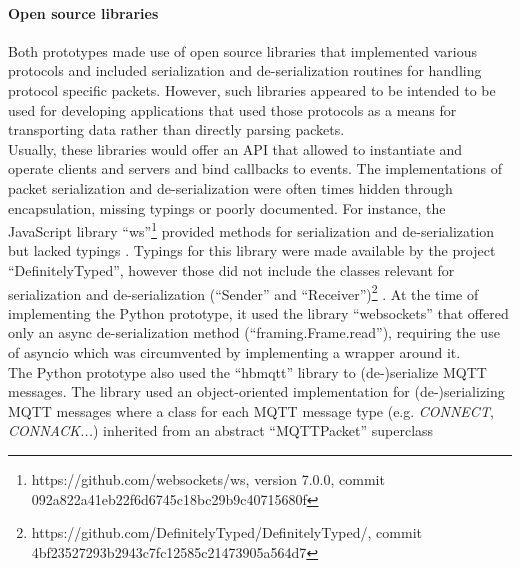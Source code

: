 \paragraph{Open source libraries} Both prototypes made use of open source libraries that implemented various protocols and included serialization and de-serialization routines for handling protocol specific packets. However, such libraries appeared to be intended to be used for developing applications that used those protocols as a means for transporting data rather than directly parsing packets.\\
Usually, these libraries would offer an API that allowed to instantiate and operate clients and servers and bind callbacks to events. The implementations of packet serialization and de-serialization were often times hidden through encapsulation, missing typings or poorly documented. For instance, the JavaScript library \enquote{ws}\footnote{https://github.com/websockets/ws, version 7.0.0, commit 092a822a41eb22f6d6745c18bc29b9c40715680f} provided methods for serialization and de-serialization but lacked typings
. Typings for this library were made available by the project \enquote{DefinitelyTyped}, however those did not include the classes relevant for serialization and de-serialization (\enquote{Sender} and \enquote{Receiver})\footnote{https://github.com/DefinitelyTyped/DefinitelyTyped/, commit 4bf23527293b2943c7fc12585c21473905a564d7}
.
At the time of implementing the Python prototype, it used the library \enquote{websockets} that offered only an async de-serialization method
(\enquote{framing.Frame.read}), requiring the use of asyncio which was circumvented by implementing a wrapper around it.\\
The Python prototype also used the \enquote{hbmqtt} library to (de-)serialize \ac{MQTT} messages. The library used an object-oriented implementation for (de-)serializing \ac{MQTT} messages where a class for each \ac{MQTT} message type (e.g. \emph{CONNECT}, \emph{CONNACK...}) inherited from an abstract \enquote{MQTTPacket} superclass %
